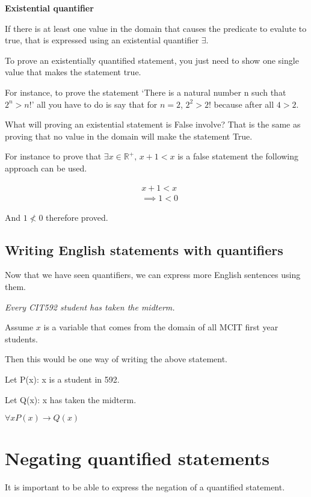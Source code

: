 \documentclass[12pt]{article}
\begin{document}
\textbf{Existential quantifier}

If there is at least one value in the domain that causes the predicate to evalute to true, that is expressed using an existential quantifier $\exists$.

To prove an existentially quantified statement, you just need to show one single value that makes the statement true.

For instance, to prove the statement `There is a natural number n such that $2^n > n!$' all you have to do is say that for $n=2$, $2^2 > 2!$ because after all $4 > 2$.

What will proving an existential statement is False involve? That is the same as proving that no value in the domain will make the statement True.

For instance to prove that $\exists x \in \mathbb{R^+}, \, x + 1 < x$ is a false statement the following approach can be used.

\begin{align*}
& x + 1 < x 
\\ & \implies 1 < 0 \tag{ by subtracting x from both sides}
\end{align*}

And $1 \not < 0$ therefore proved.

\subsection*{Writing English statements with quantifiers}

Now that we have seen quantifiers, we can express more English sentences using them.

\medskip

\emph{Every CIT592 student has taken the midterm.}

Assume $x$ is a variable that comes from the domain of all MCIT first year students.

Then this would be one way of writing the above statement.

Let P(x): x is a student in 592.

Let Q(x): x has taken the midterm.

$\forall x P(x) \rightarrow Q(x)$ 

\section*{Negating quantified statements}
It is important to be able to express the negation of a quantified statement.
\end{document}
